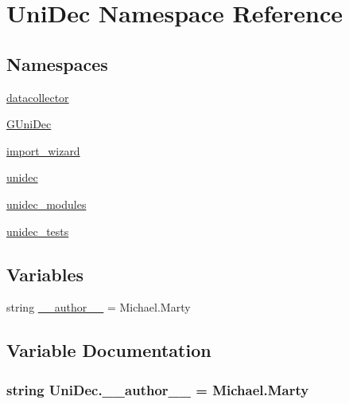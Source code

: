 \hypertarget{namespace_uni_dec}{}\section{Uni\+Dec Namespace Reference}
\label{namespace_uni_dec}
\subsection*{Namespaces}
\begin{DoxyCompactItemize}
\item 
 \hyperlink{namespace_uni_dec_1_1datacollector}{datacollector}
\item 
 \hyperlink{namespace_uni_dec_1_1_g_uni_dec}{G\+Uni\+Dec}
\item 
 \hyperlink{namespace_uni_dec_1_1import__wizard}{import\+\_\+wizard}
\item 
 \hyperlink{namespace_uni_dec_1_1unidec}{unidec}
\item 
 \hyperlink{namespace_uni_dec_1_1unidec__modules}{unidec\+\_\+modules}
\item 
 \hyperlink{namespace_uni_dec_1_1unidec__tests}{unidec\+\_\+tests}
\end{DoxyCompactItemize}
\subsection*{Variables}
\begin{DoxyCompactItemize}
\item 
string \hyperlink{namespace_uni_dec_a9e0ab49fd2048eb0ca5aa295a3dccf99}{\+\_\+\+\_\+author\+\_\+\+\_\+} = \textquotesingle{}Michael.\+Marty\textquotesingle{}
\end{DoxyCompactItemize}


\subsection{Variable Documentation}
\hypertarget{namespace_uni_dec_a9e0ab49fd2048eb0ca5aa295a3dccf99}{}
\subsubsection[{\+\_\+\+\_\+author\+\_\+\+\_\+}]{\setlength{\rightskip}{0pt plus 5cm}string Uni\+Dec.\+\_\+\+\_\+author\+\_\+\+\_\+ = \textquotesingle{}Michael.\+Marty\textquotesingle{}}\label{namespace_uni_dec_a9e0ab49fd2048eb0ca5aa295a3dccf99}
